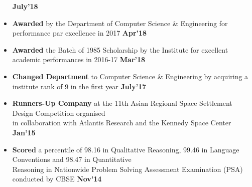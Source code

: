 \documentclass[10pt]{article}
\begin{document}
\begin{itemize}[leftmargin=*]
{\hfill}\textbf{July'18}\\[-2em]
\item \textbf{Awarded} by the Department of Computer Science \& Engineering for performance par excellence in 2017
\href{https://github.com/shmundhra/Credentials/tree/master/Scholarships} {\hspace{0.5ex}\footnotesize\faMousePointer}
{\hfill}\textbf{Apr'18}\\[-2em]
\item \textbf{Awarded} the Batch of 1985 Scholarship by the Institute for excellent academic performances in 2016-17
\href{https://github.com/shmundhra/Credentials/tree/master/Academics} {\hspace{0.5ex}\footnotesize\faMousePointer}
{\hfill}\textbf{Mar'18}\\[-2em]
\item \textbf{Changed Department} to Computer Science \& Engineering by acquiring a institute rank of 9 in the first year
\href{https://github.com/shmundhra/Credentials/tree/master/Academics} {\hspace{0.5ex}\footnotesize\faMousePointer}
{\hfill}\textbf{July'17}\\[-2em]
\item \textbf{Runners-Up Company} at the 11th Asian Regional Space Settlement Design Competition organised \\ in collaboration with Atlantis Research and the Kennedy Space Center
\href{https://github.com/shmundhra/Credentials/tree/master/Academics} {\hspace{0.5ex}\footnotesize\faMousePointer}
{\hfill}\textbf{Jan'15}\\[-2em]
\item \textbf{Scored} a percentile of 98.16 in Qualitative Reasoning, 99.46 in Language Conventions and 98.47 in Quantitative \\Reasoning in Nationwide Problem Solving Assessment Examination (PSA) conducted by CBSE
\href{https://github.com/shmundhra/Credentials/tree/master/Academics} {\hspace{0.5ex}\footnotesize\faMousePointer}
{\hfill}\textbf{Nov'14}\\[-2em]
\end{itemize}
\end{document}
